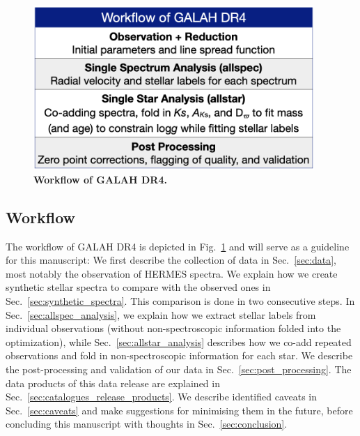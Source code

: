 \documentclass[
  journal=pasa,
  manuscript=research-paper, %
  year=2024,
  volume=37
]{cup-journal}
\begin{document}
\begin{figure}[ht]
 \centering
 \includegraphics[width=0.95\textwidth]{figures/workflow_galah_dr4.png}
 \caption{\textbf{Workflow of GALAH DR4.}}
 \label{fig:workflow_galah_dr4}
\end{figure}

\subsection{Workflow} \label{sec:workflow}

The workflow of GALAH DR4 is depicted in Fig.~\ref{fig:workflow_galah_dr4} and will serve as a guideline for this manuscript: We first describe the collection of data in Sec.~\ref{sec:data}, most notably the observation of HERMES spectra. We explain how we create synthetic stellar spectra to compare with the observed ones in Sec.~\ref{sec:synthetic_spectra}. This comparison is done in two consecutive steps. In Sec.~\ref{sec:allspec_analysis}, we explain how we extract stellar labels from individual observations (without non-spectroscopic information folded into the optimization), while Sec.~\ref{sec:allstar_analysis} describes how we co-add repeated observations and fold in non-spectroscopic information for each star. We describe the post-processing and validation of our data in Sec.~\ref{sec:post_processing}. The data products of this data release are explained in Sec.~\ref{sec:catalogues_release_products}. We describe identified caveats in Sec.~\ref{sec:caveats} and make suggestions for minimising them in the future, before concluding this manuscript with thoughts in Sec.~\ref{sec:conclusion}.
\end{document}
